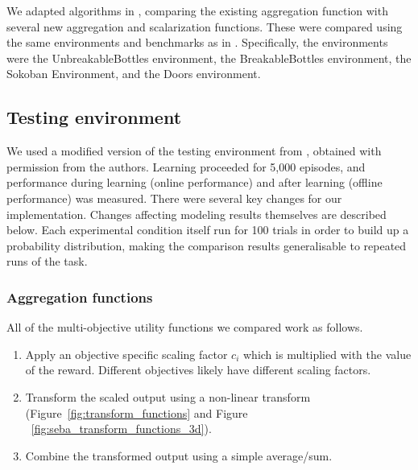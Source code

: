 We adapted algorithms in \cite{vamplew_potential-based_2021}, comparing the existing \tloA{} aggregation function with several new aggregation and scalarization functions. These were compared using the same environments and benchmarks as in \cite{vamplew_potential-based_2021}. Specifically, the environments were the UnbreakableBottles environment, the BreakableBottles environment, the Sokoban Environment, and the Doors environment.
\subsection{Testing environment}

We used a modified version of the testing environment from \cite{vamplew_potential-based_2021}, obtained with permission from the authors. Learning proceeded for 5,000 episodes, and performance during learning (online performance) and after learning (offline performance) was measured. There were several key changes for our implementation. Changes affecting modeling results themselves are described below. Each experimental condition itself run for 100 trials in order to build up a probability distribution, making the comparison results generalisable to repeated runs of the task.



\subsubsection{Aggregation functions}



All of the multi-objective utility functions we compared work as follows. 
\begin{enumerate}

    \item Apply an objective specific scaling factor $c_i$ which is multiplied with the value of the reward. Different objectives likely have different scaling factors.  
    \item Transform the scaled output using a non-linear transform (Figure~\ref{fig:transform_functions} and Figure ~\ref{fig:seba_transform_functions_3d}). %
    
    \item Combine the transformed output using a simple average/sum.
\end{enumerate}

